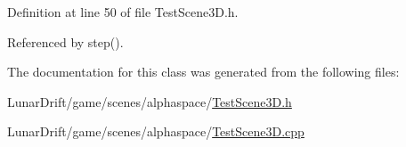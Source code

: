 Definition at line 50 of file Test\+Scene3\+D.\+h.



Referenced by step().



The documentation for this class was generated from the following files\+:\begin{DoxyCompactItemize}
\item 
Lunar\+Drift/game/scenes/alphaspace/\hyperlink{_test_scene3_d_8h}{Test\+Scene3\+D.\+h}\item 
Lunar\+Drift/game/scenes/alphaspace/\hyperlink{_test_scene3_d_8cpp}{Test\+Scene3\+D.\+cpp}\end{DoxyCompactItemize}
